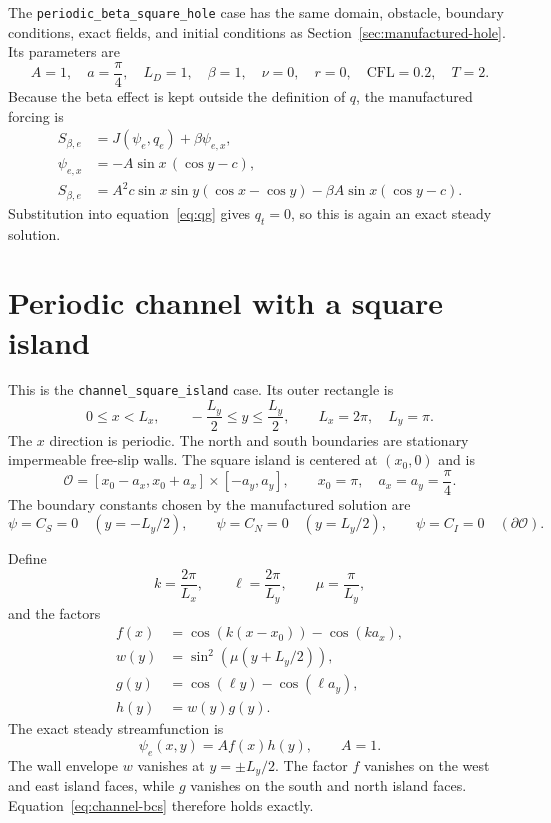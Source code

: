 \documentclass[11pt]{article}
\newcommand{\Oh}{\mathcal{O}}
\begin{document}
The \texttt{periodic\_beta\_square\_hole} case has the same domain,
obstacle, boundary conditions, exact fields, and initial conditions as
Section~\ref{sec:manufactured-hole}.  Its parameters are
\begin{equation}
  A=1,\quad a=\frac{\pi}{4},\quad L_D=1,\quad
  \beta=1,\quad \nu=0,\quad r=0,\quad
  \mathrm{CFL}=0.2,\quad T=2.
\end{equation}
Because the beta effect is kept outside the definition of $q$, the
manufactured forcing is
\begin{align}
  S_{\beta,e}
    &=J(\psi_e,q_e)+\beta\psi_{e,x},\\
  \psi_{e,x}
    &=-A\sin x\,(\cos y-c),\\
  S_{\beta,e}
    &=A^2c\sin x\sin y(\cos x-\cos y)
      -\beta A\sin x(\cos y-c).
  \label{eq:beta-source}
\end{align}
Substitution into equation~\eqref{eq:qg} gives $q_t=0$, so this is again
an exact steady solution.

\section{Periodic channel with a square island}
\label{sec:channel-island}

This is the \texttt{channel\_square\_island} case.  Its outer rectangle is
\begin{equation}
  0\le x<L_x,
  \qquad
  -\frac{L_y}{2}\le y\le\frac{L_y}{2},
  \qquad
  L_x=2\pi,\quad L_y=\pi.
\end{equation}
The $x$ direction is periodic.  The north and south boundaries are
stationary impermeable free-slip walls.  The square island is centered at
$(x_0,0)$ and is
\begin{equation}
  \Oh=[x_0-a_x,x_0+a_x]\times[-a_y,a_y],
  \qquad
  x_0=\pi,\quad a_x=a_y=\frac{\pi}{4}.
\end{equation}
The boundary constants chosen by the manufactured solution are
\begin{equation}
  \psi=C_S=0\quad (y=-L_y/2),
  \qquad
  \psi=C_N=0\quad (y=L_y/2),
  \qquad
  \psi=C_I=0\quad (\partial\Oh).
  \label{eq:channel-bcs}
\end{equation}

Define
\begin{equation}
  k=\frac{2\pi}{L_x},
  \qquad
  \ell=\frac{2\pi}{L_y},
  \qquad
  \mu=\frac{\pi}{L_y},
\end{equation}
and the factors
\begin{align}
  f(x) &= \cos(k(x-x_0))-\cos(ka_x),\\
  w(y) &= \sin^2\!\left(\mu(y+L_y/2)\right),\\
  g(y) &= \cos(\ell y)-\cos(\ell a_y),\\
  h(y) &= w(y)g(y).
\end{align}
The exact steady streamfunction is
\begin{equation}
  \psi_e(x,y)=A f(x)h(y),
  \qquad A=1.
  \label{eq:channel-psi}
\end{equation}
The wall envelope $w$ vanishes at $y=\pm L_y/2$.  The factor $f$ vanishes
on the west and east island faces, while $g$ vanishes on the south and north
island faces.  Equation~\eqref{eq:channel-bcs} therefore holds exactly.
\end{document}
